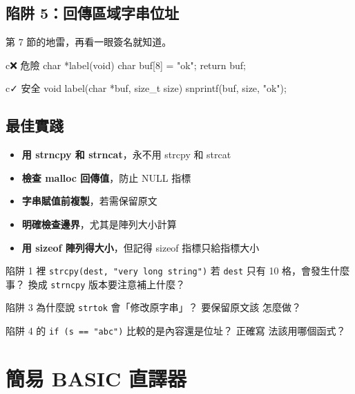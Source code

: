 \subsection{陷阱 5：回傳區域字串位址}

第 7 節的地雷，再看一眼簽名就知道。

\begin{code}{c}{❌ 危險}
char *label(void) {
    char buf[8] = "ok";
    return buf;
}
\end{code}

\begin{code}{c}{✓ 安全}
void label(char *buf, size_t size) {
    snprintf(buf, size, "ok");
}
\end{code}

\subsection{最佳實踐}

\begin{itemize}
\item \textbf{用 strncpy 和 strncat}，永不用 strcpy 和 strcat
\item \textbf{檢查 malloc 回傳值}，防止 NULL 指標
\item \textbf{字串賦值前複製}，若需保留原文
\item \textbf{明確檢查邊界}，尤其是陣列大小計算
\item \textbf{用 sizeof 陣列得大小}，但記得 sizeof 指標只給指標大小
\end{itemize}


\begin{drills}[label=drills:str-pitfalls]
\item 陷阱 1 裡 \texttt{strcpy(dest, "very long string")} 若 \texttt{dest}
只有 10 格，會發生什麼事？ 換成 \texttt{strncpy} 版本要注意補上什麼？
\item 陷阱 3 為什麼說 \texttt{strtok} 會「修改原字串」？ 要保留原文該
怎麼做？
\item 陷阱 4 的 \texttt{if (s == "abc")} 比較的是內容還是位址？ 正確寫
法該用哪個函式？
\end{drills}

\section{簡易 BASIC 直譯器}
\label{sec:str-basic-interp}

